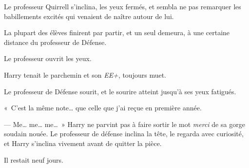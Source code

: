 Le professeur Quirrell s'inclina, les yeux fermés, et sembla ne pas remarquer les babillements excités qui venaient de naître autour de lui.

La plupart des élèves finirent par partir, et un seul demeura, à une certaine distance du professeur de Défense.

Le professeur ouvrit les yeux.

Harry tenait le parchemin et son \emph{EE+}, toujours muet.

Le professeur de Défense sourit, et le sourire atteint jusqu'à ses yeux fatigués.

«~C'est la même note… que celle que j'ai reçue en première année.

--- Me… me… me…~»
 Harry ne parvint pas à faire sortir le mot \emph{merci} de sa gorge soudain nouée.
Le professeur de défense inclina la tête, le regarda avec curiosité, et Harry s'inclina vivement avant de quitter la pièce.

Il restait neuf jours.

